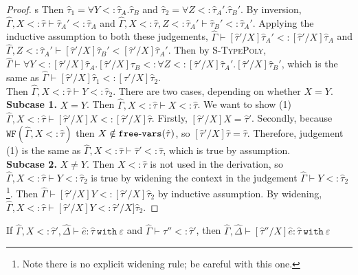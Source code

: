\documentclass{llncs}
\newcommand{\keywadj}[1]{\mathtt{#1}}
\newcommand{\keyw}[1]{\keywadj{#1}~}
\newcommand{\kw}[1]{\keyw{ #1 }}
\newcommand{\kwa}[1]{\keywadj{ #1 }}
\newcommand{\hyphen}{\hbox{-}}
\newcommand{\wf}[1]{ \kwa{WF}(#1) }
\newcommand{\fv}[1]{ \kwa{free \hyphen vars}(#1) }
\begin{document}
\begin{proof}
s Then $\hat \tau_1 = \forall Y <: \hat \tau_A. \hat \tau_B$ and $\hat \tau_2 = \forall Z <: \hat \tau_A'. \hat \tau_B'$. By inversion, $\hat \Gamma, X <: \hat \tau \vdash \hat \tau_A' <: \hat \tau_A$ and $\hat \Gamma, X <: \hat \tau, Z <: \hat \tau_A' \vdash \hat \tau_B' <: \hat \tau_A'$. Applying the inductive assumption to both these judgements, $\hat \Gamma \vdash [\hat \tau'/X]\hat \tau_A' <: [\hat \tau'/X]\hat \tau_A$ and $\hat \Gamma, Z <: \hat \tau_A' \vdash [\hat \tau'/X]\hat \tau_B' < [\hat \tau'/X]\hat \tau_A'$. Then by \textsc{S-TypePoly}, $\hat \Gamma \vdash \forall Y <: [\hat \tau'/X]\hat \tau_A. [\hat \tau'/X]\hat \tau_B <: \forall Z <: [\hat \tau'/X]\hat \tau_A'. [\hat \tau'/X]\hat \tau_B'$, which is the same as $\hat \Gamma \vdash [\hat \tau'/X]\hat \tau_1 <: [\hat \tau'/X]\hat \tau_2$.\\

 Then $\hat \Gamma, X <: \hat \tau \vdash Y <: \hat \tau_2$. There are two cases, depending on whether $X = Y$.\\

\textbf{Subcase 1.} $X = Y$. Then $\hat \Gamma, X <: \hat \tau \vdash X <: \hat \tau$. We want to show (1) $\hat \Gamma, X <: \hat \tau \vdash [\hat \tau'/X]X <: [\hat \tau'/X]\hat \tau$. Firstly, $[\hat \tau'/X]X = \hat \tau'$. Secondly, because $\wf{\hat \Gamma, X <: \hat \tau}$ then $X \notin \fv{\hat \tau}$, so $[\hat \tau'/X]\hat \tau = \hat \tau$. Therefore, judgement (1) is the same as $\hat \Gamma, X <: \hat \tau \vdash \hat \tau' <: \hat \tau$, which is true by assumption. \\

\textbf{Subcase 2.} $X \neq Y$. Then $X <: \hat \tau$ is not used in the derivation, so $\hat \Gamma, X <: \hat \tau \vdash Y <: \hat \tau_2$ is true by widening the context in the judgement $\hat \Gamma \vdash Y <: \hat \tau_2$\footnote{Note there is no explicit widening rule; be careful with this one.}. Then $\hat \Gamma \vdash [\hat \tau'/X]Y <: [\hat \tau'/X]\hat \tau_2$ by inductive assumption. By widening, $\hat \Gamma, X <: \hat \tau \vdash [\hat \tau'/X]Y <: \hat \tau'/X]\hat \tau_2$.


\end{proof}


\hrulefill

\begin{lemma}
If $\hat \Gamma, X <: \hat \tau', \hat \Delta \vdash \hat e: \hat \tau~\kw{with} \varepsilon$ and $\hat \Gamma \vdash \hat \tau'' <: \hat \tau'$, then $\hat \Gamma, \hat \Delta \vdash [\hat \tau''/X]\hat e: \hat \tau~\kw{with} \varepsilon$
\end{lemma}
\end{document}
